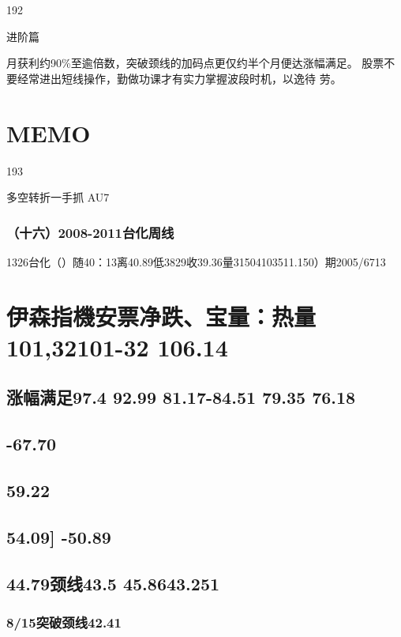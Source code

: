 \documentclass{article}
\begin{document}
192

\clearpage

进阶篇

月获利约90\%至逾倍数，突破颈线的加码点更仅约半个月便达涨幅满足。 股票不要经常进出短线操作，勤做功课才有实力掌握波段时机，以逸待 劳。

\section{MEMO}

193

\clearpage

多空转折一手抓 AU7

\subsubsection{（十六）2008-2011台化周线}

1326台化（）随40：13离40.89低3829收39.36量31504103511.150）期2005/6713

\section{伊森指機安票净跌、宝量：热量101,32101-32 106.14}

\subsection{涨幅满足97.4 92.99 81.17-84.51 79.35 76.18}

\subsection{-67.70}

\subsection{59.22}

\subsection{54.09] -50.89}

\subsection{44.79颈线43.5 45.8643.251}

\subsubsection{8/15突破颈线42.41}
\end{document}
